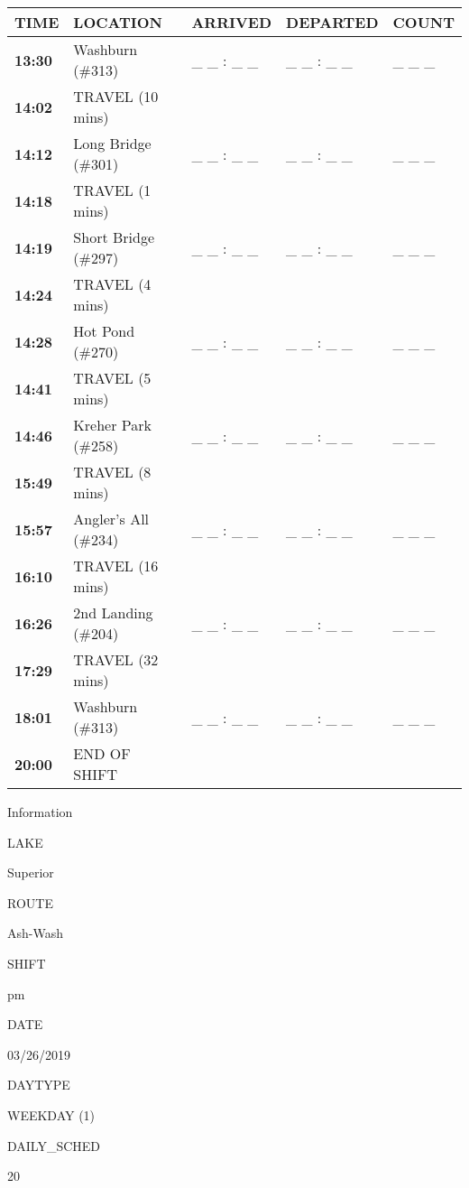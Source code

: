 \documentclass[]{article}
\begin{document}
\begin{tabular}{>{\bfseries}lllll}
\toprule
\textbf{TIME} & \textbf{LOCATION} & \textbf{ARRIVED} & \textbf{DEPARTED} & \textbf{COUNT}\\
\midrule
13:30 & Washburn (\#313) & \_ \_ : \_ \_ & \_ \_ : \_ \_ & \_ \_ \_\\
14:02 & TRAVEL (10 mins) &  &  & \\
14:12 & Long Bridge (\#301) & \_ \_ : \_ \_ & \_ \_ : \_ \_ & \_ \_ \_\\
14:18 & TRAVEL (1 mins) &  &  & \\
14:19 & Short Bridge (\#297) & \_ \_ : \_ \_ & \_ \_ : \_ \_ & \_ \_ \_\\
14:24 & TRAVEL (4 mins) &  &  & \\
14:28 & Hot Pond (\#270) & \_ \_ : \_ \_ & \_ \_ : \_ \_ & \_ \_ \_\\
14:41 & TRAVEL (5 mins) &  &  & \\
14:46 & Kreher Park (\#258) & \_ \_ : \_ \_ & \_ \_ : \_ \_ & \_ \_ \_\\
15:49 & TRAVEL (8 mins) &  &  & \\
15:57 & Angler's All (\#234) & \_ \_ : \_ \_ & \_ \_ : \_ \_ & \_ \_ \_\\
16:10 & TRAVEL (16 mins) &  &  & \\
16:26 & 2nd Landing (\#204) & \_ \_ : \_ \_ & \_ \_ : \_ \_ & \_ \_ \_\\
17:29 & TRAVEL (32 mins) &  &  & \\
18:01 & Washburn (\#313) & \_ \_ : \_ \_ & \_ \_ : \_ \_ & \_ \_ \_\\
20:00 & END OF SHIFT &  &  & \\
\bottomrule
\end{tabular}\newpage

Information

LAKE

Superior

ROUTE

Ash-Wash

SHIFT

pm

DATE

03/26/2019

DAYTYPE

WEEKDAY (1)

DAILY\_SCHED

20

\vspace{24pt}
\end{document}
